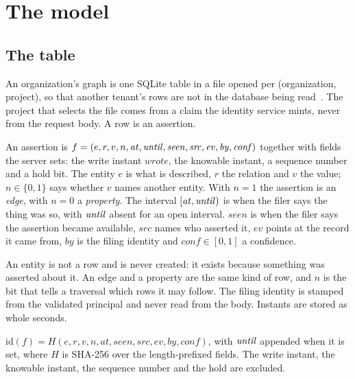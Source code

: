 \section{The model}
\label{sec:model}

\subsection{The table}

\shipped{} An organization's graph is one SQLite table in a file opened per
(organization, project), so that another tenant's rows are not in the database
being read~\cite{hip1198,sqlitedocs}. The project that selects the file comes
from a claim the identity service mints, never from the request body. A row is
an assertion.

\begin{definition}[Assertion]
An assertion is
$f = (e, r, v, n, \mathit{at}, \mathit{until}, \mathit{seen}, \mathit{src},
\mathit{ev}, \mathit{by}, \mathit{conf})$ together with fields the server sets:
the write instant $\mathit{wrote}$, the knowable instant, a sequence number and
a hold bit. The entity $e$ is what is described, $r$ the relation and $v$ the
value; $n \in \{0,1\}$ says whether $v$ names another entity. With $n = 1$ the
assertion is an \emph{edge}, with $n = 0$ a \emph{property}. The interval
$[\mathit{at}, \mathit{until})$ is when the filer says the thing was so, with $\mathit{until}$
absent for an open interval. $\mathit{seen}$ is when the filer says the
assertion became available, $\mathit{src}$ names who asserted it, $\mathit{ev}$
points at the record it came from, $\mathit{by}$ is the filing identity and
$\mathit{conf} \in [0,1]$ a confidence.
\end{definition}

An entity is not a row and is never created: it exists because something was
asserted about it. An edge and a property are the same kind of row, and $n$ is
the bit that tells a traversal which rows it may follow. The filing identity is
stamped from the validated principal and never read from the body. Instants are
stored as whole seconds.

\begin{definition}
$\mathrm{id}(f) = H(e, r, v, n, \mathit{at}, \mathit{seen}, \mathit{src},
\mathit{ev}, \mathit{by}, \mathit{conf})$, with $\mathit{until}$ appended when it is
set, where $H$ is SHA-256 over the length-prefixed fields. The write instant,
the knowable instant, the sequence number and the hold are excluded.
\end{definition}

